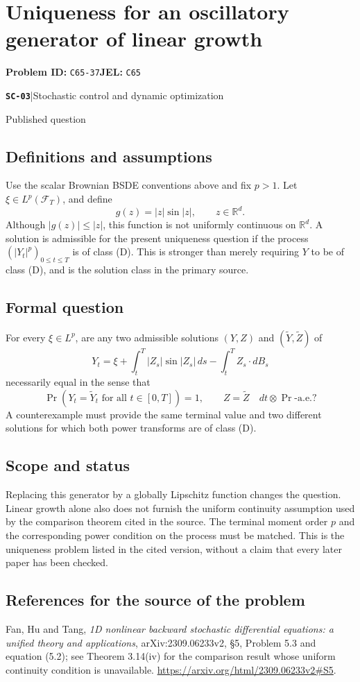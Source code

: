 \documentclass[11pt,a4paper]{article}
\newcommand{\R}{\mathbb R}
\newcommand{\entrymeta}[3]{{\sffamily\small\color{muted}\textbf{\texttt{#1}}\quad|\quad #2\par #3\par}}
\begin{document}
\section*{Uniqueness for an oscillatory generator of linear growth}
\textbf{Problem ID:} \texttt{C65-37}\quad \textbf{JEL:} \texttt{C65}\par
\label{problem:OP-0564}
\label{beyond:SC-03}
\entrymeta{SC-03}{Stochastic control and dynamic optimization}{Published question}
\subsection*{Definitions and assumptions}
Use the scalar Brownian BSDE conventions above and fix $p>1$.
Let $\xi\in L^p(\mathcal F_T)$, and define
\[
 g(z)=|z|\sin|z|,\qquad z\in\R^d.
\]
Although $|g(z)|\leq |z|$, this function is not uniformly continuous
on $\R^d$. A solution is admissible for the present uniqueness question
if the process $(|Y_t|^p)_{0\leq t\leq T}$ is of class (D).
This is stronger than merely requiring $Y$ to be of class (D), and is
the solution class in the primary source.
\subsection*{Formal question}
For every $\xi\in L^p$, are any two admissible solutions
$(Y,Z)$ and $(\widetilde Y,\widetilde Z)$ of
\[
 Y_t=\xi+\int_t^T|Z_s|\sin|Z_s|\,ds
                  -\int_t^T Z_s\cdot dB_s
\]
necessarily equal in the sense that
\[
 \Pr(Y_t=\widetilde Y_t\text{ for all }t\in[0,T])=1,
 \qquad Z=\widetilde Z\quad dt\otimes\Pr\text{-a.e.}?
\]
A counterexample must provide the same terminal value and two different
solutions for which both power transforms are of class (D).
\subsection*{Scope and status}
Replacing this generator by a globally Lipschitz function changes the
question. Linear growth alone also does not furnish the uniform
continuity assumption used by the comparison theorem cited in the
source. The terminal moment order $p$ and the corresponding power
condition on the process must be matched. This is the uniqueness
problem listed in the cited version, without a claim that every later
paper has been checked.
\subsection*{References for the source of the problem}
Fan, Hu and Tang, \emph{1D nonlinear backward stochastic differential
equations: a unified theory and applications}, arXiv:2309.06233v2,
\S5, Problem 5.3 and equation (5.2); see Theorem 3.14(iv) for the
comparison result whose uniform continuity condition is unavailable.
\url{https://arxiv.org/html/2309.06233v2#S5}.
\end{document}
